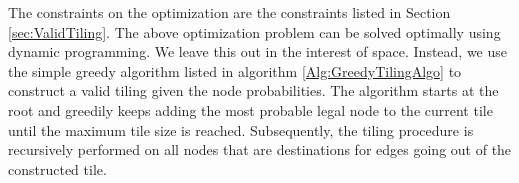 The constraints on the optimization are the constraints listed in Section \ref{sec:ValidTiling}. 
The above optimization problem can be solved optimally using dynamic programming. We leave this out in the interest of space. 
Instead, we use the simple greedy algorithm listed in algorithm \ref{Alg:GreedyTilingAlgo} to construct a valid tiling given the node probabilities.
The algorithm starts at the root and greedily keeps adding the most probable legal node to the current tile until the maximum tile size is reached.
Subsequently, the tiling procedure is recursively performed on all nodes that are destinations for edges going out of the constructed tile.







